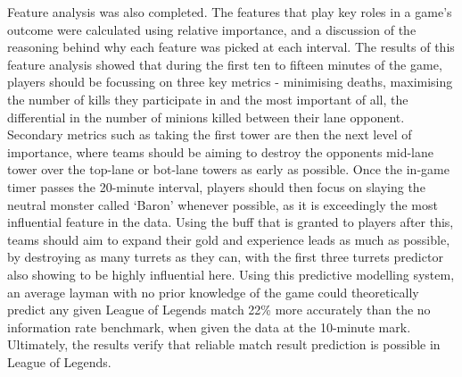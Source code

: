 Feature analysis was also completed.
The features that play key roles in a game's outcome were calculated using relative importance, and a discussion of the reasoning behind why each feature was picked at each interval.
The results of this feature analysis showed that during the first ten to fifteen minutes of the game, players should be focussing on three key metrics - minimising deaths, maximising the number of kills they participate in and the most important of all, the differential in the number of minions killed between their lane opponent.
Secondary metrics such as taking the first tower are then the next level of importance, where teams should be aiming to destroy the opponents mid-lane tower over the top-lane or bot-lane towers as early as possible.
Once the in-game timer passes the 20-minute interval, players should then focus on slaying the neutral monster called `Baron' whenever possible, as it is exceedingly the most influential feature in the data.
Using the buff that is granted to players after this, teams should aim to expand their gold and experience leads as much as possible, by destroying as many turrets as they can, with the first three turrets predictor also showing to be highly influential here.
Using this predictive modelling system, an average layman with no prior knowledge of the game could theoretically predict any given League of Legends match 22\% more accurately than the no information rate benchmark, when given the data at the 10-minute mark.
Ultimately, the results verify that reliable match result prediction is possible in League of Legends.


\newpage